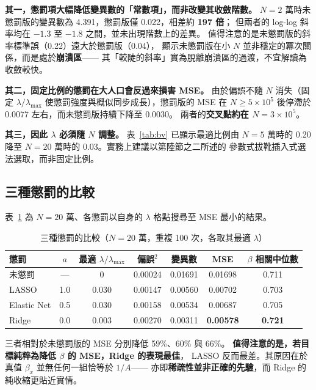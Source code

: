 \documentclass[UTF8, fontset=macnew, a4paper, 12pt]{ctexart}
\begin{document}
\textbf{其一，懲罰項大幅降低變異數的「常數項」，而非改變其收斂階數。}
$N=2$ 萬時未懲罰版的變異數為 4.391，懲罰版僅 0.022，相差約 \textbf{197 倍}；
但兩者的 log-log 斜率均在 $-1.3$ 至 $-1.8$ 之間，並未出現階數上的差異。
值得注意的是未懲罰版的斜率標準誤（0.22）遠大於懲罰版（0.04），
顯示未懲罰版在小 $N$ 並非穩定的冪次關係，而是處於\textbf{崩潰區}——
其「較陡的斜率」實為脫離崩潰區的過渡，不宜解讀為收斂較快。

\textbf{其二，固定比例的懲罰在大人口會反過來損害 MSE。} 由於偏誤不隨 $N$
消失（固定 $\lambda/\lambda_{\max}$ 使懲罰強度與概似同步成長），懲罰版的 MSE
在 $N\ge5\times10^5$ 後停滯於 0.0077 左右，而未懲罰版持續下降至 0.0030。
兩者的\textbf{交叉點約在 $N=3\times10^5$}。

\textbf{其三，因此 $\lambda$ 必須隨 $N$ 調整。} 表~\ref{tab:bv} 已顯示最適比例由
$N=5$ 萬時的 0.20 降至 $N=20$ 萬時的 0.03。實務上建議以第陸節之二所述的
參數式拔靴插入式選法選取，而非固定比例。

\subsection{三種懲罰的比較}

表~\ref{tab:pen} 為 $N=20$ 萬、各懲罰以自身的 $\lambda$ 格點搜尋至 MSE 最小的結果。

\begin{table}[H]
\centering
\caption{三種懲罰的比較（$N=20$ 萬，重複 100 次，各取其最適 $\lambda$）}
\small
\begin{tabular}{lcccccc}
\toprule
懲罰 & $a$ & 最適 $\lambda/\lambda_{\max}$ & 偏誤$^2$ & 變異數 & MSE & $\beta$ 相關中位數\\
\midrule
未懲罰 & --- & 0 & 0.00024 & 0.01691 & 0.01698 & 0.711\\
LASSO & 1.0 & 0.030 & 0.00147 & 0.00560 & 0.00702 & 0.703\\
Elastic Net & 0.5 & 0.030 & 0.00158 & 0.00534 & 0.00687 & 0.705\\
Ridge & 0.0 & 0.003 & 0.00270 & 0.00311 & \textbf{0.00578} & \textbf{0.721}\\
\bottomrule
\end{tabular}
\label{tab:pen}
\end{table}

三者相對於未懲罰版的 MSE 分別降低 59\%、60\% 與 66\%。
\textbf{值得注意的是，若目標純粹為降低 $\beta$ 的 MSE，Ridge 的表現最佳}，
LASSO 反而最差。其原因在於真值 $\beta_x$ 並無任何一組恰等於 $1/A$——
亦即\textbf{稀疏性並非正確的先驗}，而 Ridge 的純收縮更貼近實情。
\end{document}
